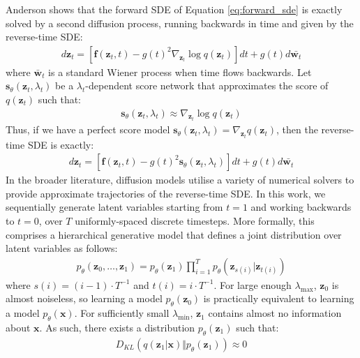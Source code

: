 \documentclass[ oneside,%
                    author={George Herbert},
                    degree={MSci},
                     title={Video Diffusion Models for Climate Simulations},
                  subtitle={}]{dissertation}
\begin{document}
Anderson \cite{Reverse_Time_Diffusion_Anderson} shows that the forward SDE of Equation \ref{eq:forward_sde} is exactly solved by a second diffusion process, running backwards in time and given by the reverse-time SDE:
\begin{align}
      d\mathbf{z}_t=\left[\mathbf{f}(\mathbf{z}_t, t)-g(t)^2\nabla_{\mathbf{z}_t}\log q(\mathbf{z}_t)\right]dt + g(t)d\bar{\mathbf{w}_t}
\end{align}
where $\bar{\mathbf{w}}_t$ is a standard Wiener process when time flows backwards. Let $\mathbf{s}_\theta(\mathbf{z}_t, \lambda_t)$ be a $\lambda_t$-dependent score network \cite{Generative_Modelling_By_Estimating_Gradients_Song} that approximates the score of $q(\mathbf{z}_t)$ such that:
\begin{align}
      \mathbf{s}_\theta(\mathbf{z}_t, \lambda_t)\approx \nabla_{\mathbf{z}_t} \log q(\mathbf{z}_t)\label{eq:score_network}
\end{align}
Thus, if we have a perfect score model $\mathbf{s}_\theta(\mathbf{z}_t, \lambda_t)=\nabla_{\mathbf{z}_t}q(\mathbf{z}_t)$, then the reverse-time SDE is exactly:
\begin{align}
      d\mathbf{z}_t=\left[\mathbf{f}(\mathbf{z}_t, t)-g(t)^2\mathbf{s}_\theta(\mathbf{z}_t, \lambda_t)\right]dt + g(t)d\bar{\mathbf{w}_t}
\end{align}
In the broader literature, diffusion models utilise a variety of numerical solvers to provide approximate trajectories of the reverse-time SDE. In this work, we sequentially generate latent variables starting from $t=1$ and working backwards to $t=0$, over $T$ uniformly-spaced discrete timesteps. More formally, this comprises a hierarchical generative model that defines a joint distribution over latent variables as follows:
\begin{align}
      p_\theta(\mathbf{z}_0,\ldots,\mathbf{z}_1)=p_\theta(\mathbf{z}_1)\prod_{i=1}^T p_\theta(\mathbf{z}_{s(i)}|\mathbf{z}_{t(i)})
\end{align}
where $s(i)=(i - 1)\cdot T^{-1}$ and $t(i)=i\cdot T^{-1}$. For large enough $\lambda_{\max}$, $\mathbf{z}_0$ is almost noiseless, so learning a model $p_\theta(\mathbf{z}_0)$ is practically equivalent to learning a model $p_\theta(\mathbf{x})$. For sufficiently small $\lambda_{\min}$, $\mathbf{z}_1$ contains almost no information about $\mathbf{x}$. As such, there exists a distribution $p_\theta(\mathbf{z}_1)$ such that:
\begin{align}
      D_{KL}(q(\mathbf{z}_1|\mathbf{x})\Vert p_\theta(\mathbf{z}_1))\approx 0
\end{align}
\end{document}
